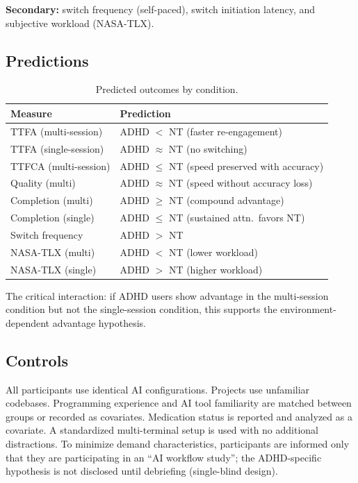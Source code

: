 \documentclass[sigconf,nonacm]{acmart}
\begin{document}
\textbf{Secondary:} switch frequency (self-paced), switch initiation latency, and subjective workload (NASA-TLX).

\subsection{Predictions}

\begin{table}[htbp]
\caption{Predicted outcomes by condition.}
\label{tab:predictions}
\begin{tabular}{@{}ll@{}}
\toprule
\textbf{Measure} & \textbf{Prediction} \\
\midrule
TTFA (multi-session) & ADHD $<$ NT (faster re-engagement) \\
TTFA (single-session) & ADHD $\approx$ NT (no switching) \\
TTFCA (multi-session) & ADHD $\leq$ NT (speed preserved with accuracy) \\
Quality (multi) & ADHD $\approx$ NT (speed without accuracy loss) \\
Completion (multi) & ADHD $\geq$ NT (compound advantage) \\
Completion (single) & ADHD $\leq$ NT (sustained attn.\ favors NT) \\
Switch frequency & ADHD $>$ NT \\
NASA-TLX (multi) & ADHD $<$ NT (lower workload) \\
NASA-TLX (single) & ADHD $>$ NT (higher workload) \\
\bottomrule
\end{tabular}
\end{table}

The critical interaction: if ADHD users show advantage in the multi-session condition but not the single-session condition, this supports the environment-dependent advantage hypothesis.

\subsection{Controls}

All participants use identical AI configurations. Projects use unfamiliar codebases. Programming experience and AI tool familiarity are matched between groups or recorded as covariates. Medication status is reported and analyzed as a covariate. A standardized multi-terminal setup is used with no additional distractions. To minimize demand characteristics, participants are informed only that they are participating in an ``AI workflow study''; the ADHD-specific hypothesis is not disclosed until debriefing (single-blind design).
\end{document}
